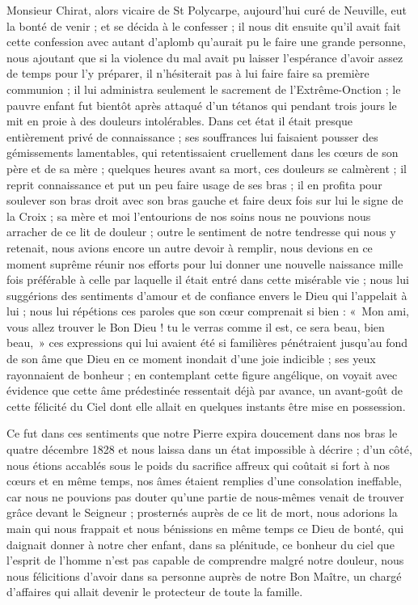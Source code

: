 \documentclass[11pt,a4paper]{report}
\begin{document}
Monsieur Chirat, alors vicaire de St Polycarpe, aujourd'hui curé de Neuville, eut la bonté de venir ; et se décida à le confesser ; il nous dit ensuite qu'il avait fait cette confession avec autant d'aplomb qu'aurait pu le faire une grande personne, nous ajoutant que si la violence du mal avait pu laisser l'espérance d'avoir assez de temps pour l'y préparer, il n'hésiterait pas à lui faire faire sa première communion ; il lui administra seulement le sacrement de l'Extrême-Onction ; le pauvre enfant fut bientôt après attaqué d'un tétanos qui pendant trois jours le mit en proie à des douleurs intolérables. Dans cet état il était presque entièrement privé de connaissance ; ses souffrances lui faisaient pousser des gémissements lamentables, qui retentissaient cruellement dans les cœurs de son père et de sa mère ; quelques heures avant sa mort, ces douleurs se calmèrent ; il reprit connaissance et put un peu faire usage de ses bras ; il en profita pour soulever son bras droit avec son bras gauche et faire deux fois sur lui le signe de la Croix ; sa mère et moi l'entourions de nos soins nous ne pouvions nous arracher de ce lit de douleur ; outre le sentiment de notre tendresse qui nous y retenait, nous avions encore un autre devoir à remplir, nous devions en ce moment suprême réunir nos efforts pour lui donner une nouvelle naissance mille fois préférable à celle par laquelle il était entré dans cette misérable vie ; nous lui suggérions des sentiments d'amour et de confiance envers le Dieu qui l'appelait à lui ; nous lui répétions ces paroles que son cœur comprenait si bien : «~Mon ami, vous allez trouver le Bon Dieu ! tu le verras comme il est, ce sera beau, bien beau,~» ces expressions qui lui avaient été si familières pénétraient jusqu'au fond de son âme que Dieu en ce moment inondait d'une joie indicible ; ses yeux rayonnaient de bonheur ; en contemplant cette figure angélique, on voyait avec évidence que cette âme prédestinée ressentait déjà par avance, un avant-goût de cette félicité du Ciel dont elle allait en quelques instants être mise en possession.

Ce fut dans ces sentiments que notre Pierre expira doucement dans nos bras le quatre décembre 1828 et nous laissa dans un état impossible à décrire ; d'un côté, nous étions accablés sous le poids du sacrifice affreux qui coûtait si fort à nos cœurs et en même temps, nos âmes étaient remplies d'une consolation ineffable, car nous ne pouvions pas douter qu'une partie de nous-mêmes venait de trouver grâce devant le Seigneur ; prosternés auprès de ce lit de mort, nous adorions la main qui nous frappait et nous bénissions en même temps ce Dieu de bonté, qui daignait donner à notre cher enfant, dans sa plénitude, ce bonheur du ciel que l'esprit de l'homme n'est pas capable de comprendre malgré notre douleur, nous nous félicitions d'avoir dans sa personne auprès de notre Bon Maître, un chargé d'affaires qui allait devenir le protecteur de toute la famille.
\end{document}

